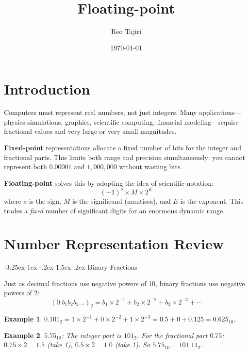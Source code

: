 \documentclass{article}
\title{Floating-point}
\author{Reo Tajiri}
\date{\today}
\makeatletter
\newtheorem{example}{Example}[section]
\theoremstyle{remark}
\newlength{\subsecindent}
\renewcommand\subsection{\@startsection{subsection}{2}{\subsecindent}%
  {-3.25ex\@plus -1ex \@minus -.2ex}%
  {1.5ex \@plus .2ex}%
  {\normalfont\large\bfseries}}
\newenvironment{sub}{%
  \begin{list}{}{%
    \setlength{\leftmargin}{4em}%
    \setlength{\rightmargin}{0pt}%
    \setlength{\topsep}{0pt}%
    \setlength{\partopsep}{0pt}%
    \setlength{\parsep}{\parskip}%
    \setlength{\itemsep}{\parskip}%
  }\item\relax
}{\end{list}}
\newenvironment{secbody}{%
  \begin{list}{}{%
    \setlength{\leftmargin}{\subsecindent}%
    \setlength{\rightmargin}{0pt}%
    \setlength{\topsep}{0pt}%
    \setlength{\partopsep}{0pt}%
    \setlength{\parsep}{\parskip}%
    \setlength{\itemsep}{\parskip}%
  }\item\relax
}{\end{list}}
\makeatother
\begin{document}
\maketitle
\tableofcontents
\newpage

\section{Introduction}

\begin{secbody}
Computers must represent real numbers, not just integers.
Many applications---physics simulations, graphics, scientific computing,
financial modeling---require fractional values and very large or very small
magnitudes.

\textbf{Fixed-point} representations allocate a fixed number of bits for the
integer and fractional parts.  This limits both range and precision
simultaneously: you cannot represent both $0.00001$ and $1{,}000{,}000$ without
wasting bits.

\textbf{Floating-point} solves this by adopting the idea of scientific
notation:
\[
  (-1)^{s} \times M \times 2^{E}
\]
where $s$ is the sign, $M$ is the significand (mantissa), and $E$ is the
exponent.  This trades a \emph{fixed} number of significant digits for an
enormous dynamic range.
\end{secbody}

\section{Number Representation Review}

\subsection{Binary Fractions}
\begin{sub}
Just as decimal fractions use negative powers of 10, binary fractions use
negative powers of 2:
\[
  (0.b_1 b_2 b_3 \ldots)_2
  = b_1 \times 2^{-1} + b_2 \times 2^{-2} + b_3 \times 2^{-3} + \cdots
\]

\begin{example}
$0.101_2 = 1\times2^{-1} + 0\times2^{-2} + 1\times2^{-3}
          = 0.5 + 0 + 0.125 = 0.625_{10}$.
\end{example}

\begin{example}
$5.75_{10}$: The integer part is $101_2$. For the fractional part $0.75$:
$0.75\times2=1.5$ (take 1), $0.5\times2=1.0$ (take 1).  So $5.75_{10} =
101.11_2$.
\end{example}
\end{sub}
\end{document}
